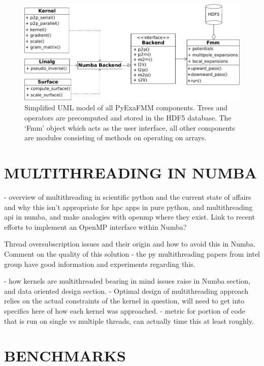 \documentclass{IEEEcsmag}
\begin{document}
\begin{figure}
    \centerline{\includegraphics {figures/software.pdf}}
    \caption{Simplified UML model of all PyExaFMM components. Trees and operators are precomputed and stored in the HDF5 database. The `Fmm' object which acts as the user interface, all other components are modules consisting of methods on operating on arrays.}
    \label{fig:design}
\end{figure}

\section{MULTITHREADING IN NUMBA}

- overview of multithreading in scientific python and the current state of affairs and why this isn't appropriate for hpc apps in pure python, and multithreading api in numba, and make analogies with openmp where they exist. Link to recent efforts to implement an OpenMP interface within Numba?

Thread oversubscription issues and their origin and how to avoid this in Numba. Comment on the quality of this solution - the py multithreading papers from intel group have good information and experiments regarding this.

- how kernels are multithreaded bearing in mind issues raise in Numba section, and data oriented design section.
- Optimal design of multithreading approach relies on the actual constraints of the kernel in question, will need to get into specifics here of how each kernel was approached.
- metric for portion of code that is run on single vs multiple threads, can actually time this at least roughly.




\section{BENCHMARKS}
\end{document}
